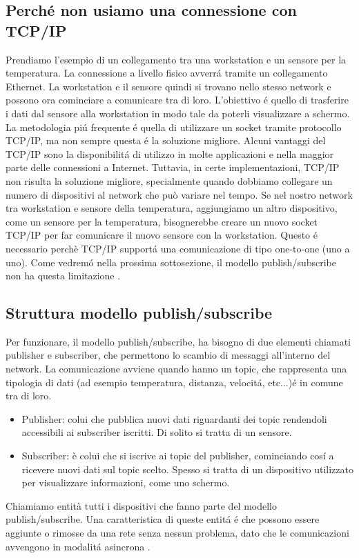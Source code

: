 \subsection{Perché non usiamo una connessione con TCP/IP}
Prendiamo l'esempio di un collegamento tra una workstation e 
un sensore per la temperatura. La connessione a livello fisico
avverrá tramite un collegamento Ethernet. La workstation e il 
sensore quindi si trovano nello stesso network e possono 
ora cominciare a comunicare tra di loro. L'obiettivo é quello
di trasferire i dati dal sensore alla workstation in modo tale
da poterli visualizzare a schermo.
La metodologia piú frequente é quella di utilizzare un socket tramite 
protocollo TCP/IP, ma non sempre questa é la soluzione migliore.
Alcuni vantaggi del TCP/IP sono la disponibilitá di utilizzo 
in molte applicazioni e nella maggior parte 
delle connessioni a Internet.
Tuttavia, in certe implementazioni, TCP/IP non risulta la soluzione migliore,
specialmente quando dobbiamo collegare un numero di dispositivi al 
network che può variare nel tempo. Se nel nostro network tra workstation e 
sensore della temperatura, aggiungiamo un altro dispositivo, come un 
sensore per la temperatura, bisognerebbe creare un nuovo socket 
TCP/IP per far comunicare il nuovo sensore con la workstation.
Questo é necessario perchè TCP/IP supportá una comunicazione di tipo 
one-to-one (uno a uno). Come vedremó nella prossima sottosezione,
il modello publish/subscribe non ha questa limitazione \cite{1494965}.

\subsection{Struttura modello publish/subscribe}
Per funzionare, il modello publish/subscribe, ha bisogno di
due elementi chiamati publisher e subscriber, 
che permettono lo scambio di messaggi all'interno del network.
La comunicazione avviene 
quando hanno un topic, che
rappresenta una tipologia di dati (ad esempio temperatura, 
distanza, velocitá, etc...)é in comune tra di loro.
\begin{itemize}
    \item Publisher: colui che pubblica nuovi dati riguardanti dei
    topic rendendoli accessibili ai subscriber iscritti. 
    Di solito si tratta di un sensore.
    \item Subscriber: è colui che si iscrive ai topic del publisher, 
    cominciando
    cosí a ricevere nuovi dati sul topic scelto. Spesso si tratta
    di un dispositivo utilizzato per visualizzare informazioni, come uno
    schermo.
\end{itemize}
Chiamiamo entità tutti i dispositivi che fanno parte del modello 
publish/subscribe.
Una caratteristica di queste entitá é che possono essere aggiunte o rimosse
da una rete senza nessun problema, dato che le 
comunicazioni avvengono in modalitá asincrona \cite{dds1.4}. 

